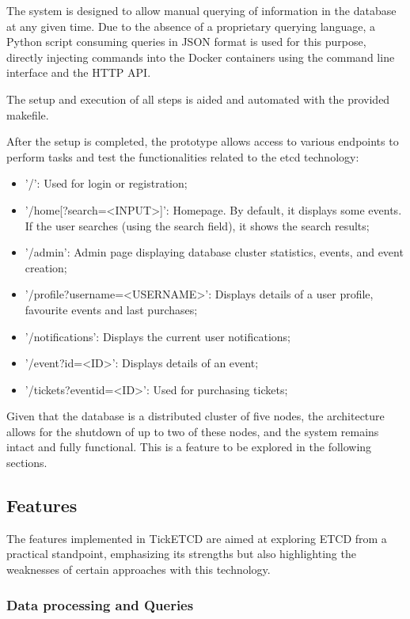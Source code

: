 \documentclass[screen,review]{acmart}
\begin{document}
The system is designed to allow manual querying of information in the database at any given time. Due to the absence of a proprietary querying language, a Python script consuming queries in JSON format is used for this purpose, directly injecting commands into the Docker containers using the command line interface and the HTTP API.

The setup and execution of all steps is aided and automated with the provided makefile.

After the setup is completed, the prototype allows access to various endpoints to perform tasks and test the functionalities related to the etcd technology:

\begin{itemize}
    \item '/': Used for login or registration;
    \item '/home[?search=<INPUT>]': Homepage. By default, it displays some events. If the user searches (using the search field), it shows the search results;
    \item '/admin': Admin page displaying database cluster statistics, events, and event creation;
    \item '/profile?username=<USERNAME>': Displays details of a user profile, favourite events and last purchases;
    \item '/notifications': Displays the current user notifications;
    \item '/event?id=<ID>': Displays details of an event;
    \item '/tickets?eventid=<ID>': Used for purchasing tickets;
\end{itemize}

Given that the database is a distributed cluster of five nodes, the architecture allows for the shutdown of up to two of these nodes, and the system remains intact and fully functional. This is a feature to be explored in the following sections.

\subsection{Features}

The features implemented in TickETCD are aimed at exploring ETCD from a practical standpoint, emphasizing its strengths but also highlighting the weaknesses of certain approaches with this technology.

\subsubsection{Data processing and Queries}~\
\end{document}
